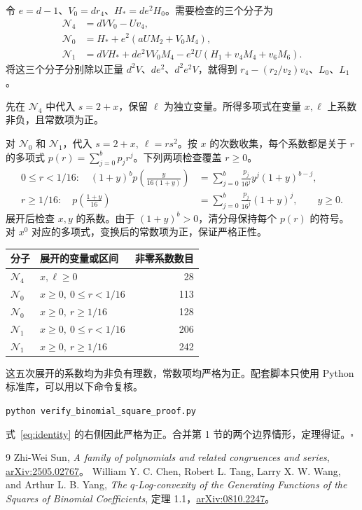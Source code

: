 \documentclass[11pt,UTF8,fontset=fandol,scheme=plain]{ctexart}
\newcommand{\ellbound}{\ell}
\newcommand{\Nzero}{\mathcal{N}_0}
\newcommand{\None}{\mathcal{N}_1}
\newcommand{\Nfour}{\mathcal{N}_4}
\begin{document}
令 \(e=d-1\)、\(V_0=dr_4\)、\(H_*=de^2H_0\)。需要检查的三个分子为
\begin{align*}
  \Nfour &= d V V_0-Uv_4,\\
  \Nzero &= H_*+e^2(aUM_2+V_0M_4),\\
  \None &= dVH_*+de^2VV_0M_4-e^2U(H_1+v_4M_4+v_6M_6).
\end{align*}
将这三个分子分别除以正量 \(d^2V\)、\(de^2\)、\(d^2e^2V\)，就得到 \(r_4-(r_2/v_2)v_4\)、\(L_0\)、\(L_1\)。

先在 \(\Nfour\) 中代入 \(s=2+x\)，保留 \(\ellbound\) 为独立变量。所得多项式在变量 \(x,\ellbound\) 上系数非负，且常数项为正。

对 \(\Nzero\) 和 \(\None\)，代入 \(s=2+x,\ \ellbound=rs^2\)。按 \(x\) 的次数收集，每个系数都是关于 \(r\) 的多项式 \(p(r)=\sum_{j=0}^{b}p_jr^j\)。下列两项检查覆盖 \(r\ge0\)。
\begin{align*}
 0\le r<1/16\colon\quad
 (1+y)^b p\!\left(\frac{y}{16(1+y)}\right)
 &=\sum_{j=0}^b\frac{p_j}{16^j}y^j(1+y)^{b-j},\\
 r\ge1/16\colon\quad
 p\!\left(\frac{1+y}{16}\right)
 &=\sum_{j=0}^b\frac{p_j}{16^j}(1+y)^j,
 \qquad y\ge0.
\end{align*}
展开后检查 \(x,y\) 的系数。由于 \((1+y)^b>0\)，清分母保持每个 \(p(r)\) 的符号。对 \(x^0\) 对应的多项式，变换后的常数项为正，保证严格正性。

\begin{center}
\small
\begin{tabular}{@{}llr@{}}
\toprule
分子 & 展开的变量或区间 & 非零系数数目\\
\midrule
\(\Nfour\) & \(x,\ellbound\ge0\) & 28\\
\(\Nzero\) & \(x\ge0,\ 0\le r<1/16\) & 113\\
\(\Nzero\) & \(x\ge0,\ r\ge1/16\) & 128\\
\(\None\) & \(x\ge0,\ 0\le r<1/16\) & 206\\
\(\None\) & \(x\ge0,\ r\ge1/16\) & 242\\
\bottomrule
\end{tabular}
\end{center}

这五次展开的系数均为非负有理数，常数项均严格为正。配套脚本只使用 Python 标准库，可以用以下命令复核。
\begin{center}
\texttt{python verify\_binomial\_square\_proof.py}
\end{center}
式~\eqref{eq:identity} 的右侧因此严格为正。合并第 1 节的两个边界情形，定理得证。\hfill\(\square\)

\begin{thebibliography}{9}
   Zhi-Wei Sun,
  \emph{A family of polynomials and related congruences and series},
  \href{https://arxiv.org/abs/2505.02767}{arXiv:2505.02767}。
   William Y. C. Chen, Robert L. Tang, Larry X. W. Wang, and Arthur L. B. Yang,
  \emph{The \(q\)-Log-convexity of the Generating Functions of the Squares of Binomial Coefficients},
  定理 1.1，\href{https://arxiv.org/abs/0810.2247}{arXiv:0810.2247}。
\end{thebibliography}
\end{document}
